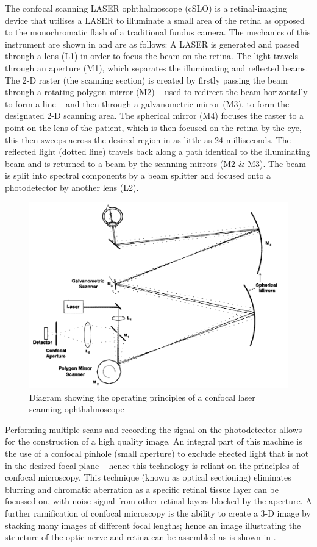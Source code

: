 The confocal scanning LASER ophthalmoscope (cSLO) is a retinal-imaging device
that utilises a LASER to illuminate a small area of the retina as opposed to
the monochromatic flash of a traditional fundus camera. The mechanics of this
instrument are shown in and are as follows: A LASER is generated
and passed through a lens (L1) in order to focus the beam on the retina. The
light travels through an aperture (M1), which separates the illuminating and
reflected beams. The 2-D raster (the scanning section) is created by firstly
passing the beam through a rotating polygon mirror (M2) – used to redirect
the beam horizontally to form a line – and then through a galvanometric
mirror (M3), to form the designated 2-D scanning area. The spherical mirror
(M4) focuses the raster to a point on the lens of the patient, which is then
focused on the retina by the eye, this then sweeps across the desired region
in as little as 24 milliseconds. The reflected light (dotted line) travels
back along a path identical to the illuminating beam and is returned to a
beam by the scanning mirrors (M2 \& M3). The beam is split into spectral
components by a beam splitter and focused onto a photodetector by another
lens (L2).\cite{webb1987confocal}

\begin{figure}[htbp]
\centering
 \includegraphics{figures/cslo}
\caption{Diagram showing the operating principles of a confocal laser scanning ophthalmoscope}
\label{fig:cslo}
\end{figure}


Performing multiple scans and recording the signal on the photodetector
allows for the construction of a high quality image. An integral part of
this machine is the use of a confocal pinhole (small aperture) to exclude 
eflected light that is not in the desired focal plane – hence this technology
is reliant on the principles of confocal microscopy. This technique (known as
optical sectioning) eliminates blurring and chromatic aberration as a specific
retinal tissue layer can be focussed on, with noise signal from other retinal
layers blocked by the aperture.\cite{sharp2004scanning} A further ramification
of confocal microscopy is the ability to create a 3-D image by stacking many
images of different focal lengths; hence an image illustrating the structure
of the optic nerve and retina can be assembled as is shown in .

